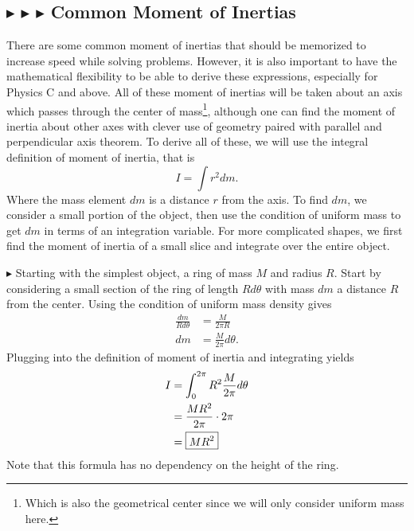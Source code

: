 \subsection{\color{PineGreen} $\blacktriangleright$ \color{Goldenrod} $\blacktriangleright$ \color{Orchid} $\blacktriangleright$ \color{black} Common Moment of Inertias} \label{1.4.4}
There are some common moment of inertias that should be memorized to increase speed while solving problems. However, it is also important to have the mathematical flexibility to be able to derive these expressions, especially for Physics C and above. All of these moment of inertias will be taken about an axis which passes through the center of mass\footnote{Which is also the geometrical center since we will only consider uniform mass here.}, although one can find the moment of inertia about other axes with clever use of geometry paired with parallel and perpendicular axis theorem. To derive all of these, we will use the integral definition of moment of inertia, that is
\begin{equation}
    I = \int r^2 dm.
\end{equation}
\noindent Where the mass element $dm$ is a distance $r$ from the axis. To find $dm$, we consider a small portion of the object, then use the condition of uniform mass to get $dm$ in terms of an integration variable. For more complicated shapes, we first find the moment of inertia of a small slice and integrate over the entire object.

\noindent $\blacktriangleright$ Starting with the simplest object, a ring of mass $M$ and radius $R$. Start by considering a small section of the ring of length $Rd\theta$ with mass $dm$ a distance $R$ from the center. Using the condition of uniform mass density gives
\begin{align*}
    \frac{dm}{Rd\theta} &= \frac{M}{2\pi R} \\
    dm &= \frac{M}{2\pi}d\theta.
\end{align*}
\noindent Plugging into the definition of moment of inertia and integrating yields
\begin{align}
    I &= \int_0^{2\pi} R^2 \frac{M}{2\pi}d\theta \nonumber \\
    &= \frac{MR^2}{2\pi}\cdot 2\pi \nonumber \\
    &= \boxed{MR^2}
\end{align}
\noindent Note that this formula has no dependency on the height of the ring.

